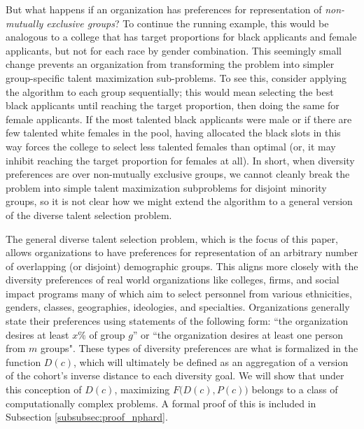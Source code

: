 But what happens if an organization has preferences for representation of \emph{non-mutually exclusive groups}? To continue the running example, this would be analogous to a college that has target proportions for black applicants and female applicants, but not for each race by gender combination. This seemingly small change prevents an organization from transforming the problem into simpler group-specific talent maximization sub-problems. To see this, consider applying the  algorithm to each group sequentially; this would mean selecting the best black applicants until reaching the target proportion, then doing the same for female applicants. If the most talented black applicants were male or if there are few talented white females in the pool, having allocated the black slots in this way forces the college to select less talented females than optimal (or, it may inhibit reaching the target proportion for females at all). In short, when diversity preferences are over non-mutually exclusive groups, we cannot cleanly break the problem into simple talent maximization subproblems for disjoint minority groups, so it is not clear how we might extend the  algorithm to a general version of the diverse talent selection problem. 

The general diverse talent selection problem, which is the focus of this paper, allows organizations to have preferences for representation of an arbitrary number of overlapping (or disjoint) demographic groups. This aligns more closely with the diversity preferences of real world organizations like colleges, firms, and social impact programs many of which aim to select personnel from various ethnicities, genders, classes, geographies, ideologies, and specialties. Organizations generally state their preferences using statements of the following form: ``the organization desires at least $x\%$ of group $g$'' or ``the organization desires at least one person from $m$ groups". These types of diversity preferences are what is formalized in the function $D(c)$, which will ultimately be defined as an aggregation of a version of the cohort's inverse distance to each diversity goal. We will show that under this conception of $D(c)$, maximizing $F\Big(D(c),P(c)\Big)$ belongs to a class of computationally complex problems. A formal proof of this is included in Subsection \ref{subsubsec:proof_nphard}.

